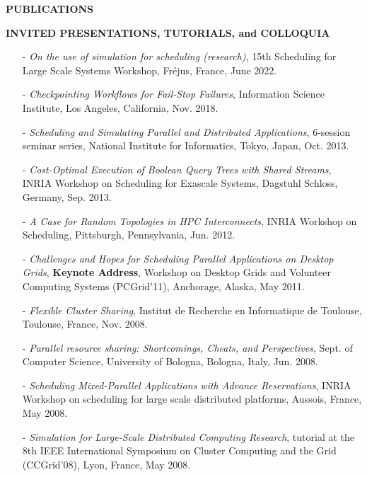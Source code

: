 \documentclass[times,11pt]{letter}
\begin{document}
\noindent
{\large{\bf PUBLICATIONS}}



\noindent
{\large{\bf INVITED PRESENTATIONS, TUTORIALS, and COLLOQUIA}}

\begin{itemize}

\item [-] {\it On the use of simulation for scheduling (research)}, 
15th Scheduling for Large Scale Systems Workshop, Fr\'ejus, France, June 2022.

\item [-] {\it Checkpointing Workflows for Fail-Stop Failures}, 
Information Science Institute, Los Angeles, California, Nov. 2018.

\item [-] {\it Scheduling and Simulating Parallel and Distributed
Applications}, 6-session seminar series, National Institute for
Informatics, Tokyo, Japan, Oct. 2013.

\item [-] {\it Cost-Optimal Execution of Boolean Query Trees with Shared
Streams}, INRIA Workshop on Scheduling for Exascale Systems, Dagstuhl
Schloss, Germany, Sep. 2013.

\item [-] {\it A Case for Random Topologies in HPC Interconnects},
INRIA Workshop on Scheduling, Pittsburgh, Pennsylvania, 
Jun. 2012.

\item [-] {\it Challenges and Hopes for Scheduling Parallel Applications on Desktop Grids}, {\bf Keynote Address}, Workshop on Desktop Grids and Volunteer Computing Systems (PCGrid'11), Anchorage, Alaska, May 2011. 

\item [-] {\it Flexible Cluster Sharing}, Institut de Recherche
en Informatique de Toulouse, Toulouse, France, Nov. 2008. 

\item [-] {\it Parallel resource sharing: Shortcomings, Cheats, and
Perspectives}, Sept. of Computer Science, University of Bologna, Bologna,
Italy, Jun. 2008.


\item [-] {\it Scheduling Mixed-Parallel Applications with Advance
Reservations}, INRIA Workshop on scheduling for large scale distributed
platforms, Aussois, France, May 2008.

\item [-] {\it Simulation for Large-Scale Distributed Computing Research},
tutorial at the 8th IEEE International Symposium on Cluster Computing and the Grid (CCGrid'08), Lyon, France, May 2008.


\end{itemize}
\end{document}
